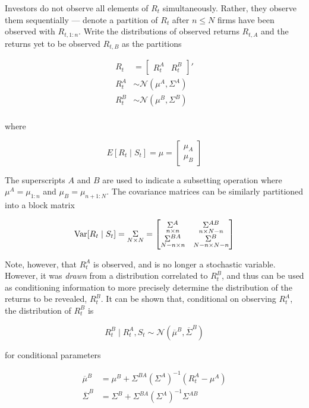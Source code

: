 \documentclass{article}
\begin{document}
Investors do not observe all elements of $R_t$ simultaneously. Rather, they observe them sequentially --- denote a partition of $R_t$ after $n \le N$ firms have been observed with $R_{t,1:n}$. Write the distributions of observed returns $R_{t,A}$ and the returns yet to be observed $R_{t,B}$ as the partitions

\begin{align*}
    R_t &= \begin{bmatrix}
        R^A_t & R^B_t
    \end{bmatrix}' \\ 
    R^A_{t} &\sim \mathcal{N}(\mu^A, \Sigma^A) \\
    R^B_{t} &\sim \mathcal{N}(\mu^B, \Sigma^B) \\
\end{align*}

\noindent where 

$$
E[R_t \mid S_t] = \mu = \begin{bmatrix}
    \mu_A \\
    \mu_B
\end{bmatrix}
$$

The superscripts $A$ and $B$ are used to indicate a subsetting operation where $\mu^A = \mu_{1:n}$ and $\mu_B = \mu_{n+1:N}$. The covariance matrices can be similarly partitioned into a block matrix

$$
\text{Var}[R_t \mid S_t] = \underset{N \times N}{\Sigma} = \begin{bmatrix}
    \underset{n\times n}{\Sigma^A} & \underset{n\times N-n}{\Sigma^{AB}} \\
    \underset{N-n\times n}{\Sigma^{BA}} & \underset{N-n\times N-n}{\Sigma^B} \\
\end{bmatrix}
$$

Note, however, that $R_t^A$ is observed, and is no longer a stochastic variable. However, it was \textit{drawn} from a distribution correlated to $R_t^B$, and thus can be used as conditioning information to more precisely determine the distribution of the returns to be revealed, $R_t^B$. It can be shown  that, conditional on observing $R_t^A$, the distribution of $R_t^B$ is

$$
R_t^B \mid R_t^A, S_t \sim \mathcal{N} (\overline \mu^B, \overline \Sigma^B)
$$

\noindent for conditional parameters

\begin{align*}
    \overline \mu^B &= \mu^B + \Sigma^{BA} (\Sigma^{A})^{-1}(R_t^A - \mu^A)\\
    \overline \Sigma^B &= \Sigma^B + \Sigma^{BA} (\Sigma^{A})^{-1}\Sigma^{AB}
\end{align*}
\end{document}
